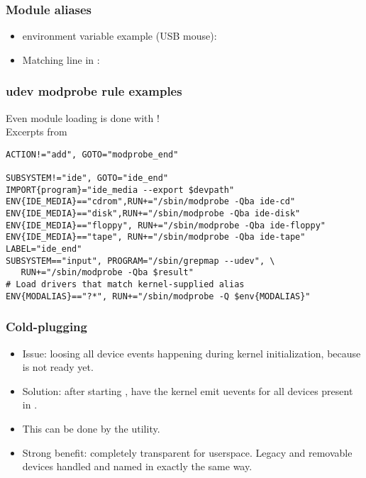 \begin{frame}
  \frametitle{Module aliases}
  \begin{itemize}
  \item {} environment variable example (USB mouse):\\
  \item Matching line in :\\
  \end{itemize}
\end{frame}

\begin{frame}[fragile]
  \frametitle{udev modprobe rule examples}
  Even module loading is done with !\\
  Excerpts from 
  \begin{block}{}
\footnotesize
\begin{verbatim}
ACTION!="add", GOTO="modprobe_end"

SUBSYSTEM!="ide", GOTO="ide_end"
IMPORT{program}="ide_media --export $devpath"
ENV{IDE_MEDIA}=="cdrom",RUN+="/sbin/modprobe -Qba ide-cd"
ENV{IDE_MEDIA}=="disk",RUN+="/sbin/modprobe -Qba ide-disk"
ENV{IDE_MEDIA}=="floppy", RUN+="/sbin/modprobe -Qba ide-floppy"
ENV{IDE_MEDIA}=="tape", RUN+="/sbin/modprobe -Qba ide-tape"
LABEL="ide_end"
SUBSYSTEM=="input", PROGRAM="/sbin/grepmap --udev", \
   RUN+="/sbin/modprobe -Qba $result"
# Load drivers that match kernel-supplied alias
ENV{MODALIAS}=="?*", RUN+="/sbin/modprobe -Q $env{MODALIAS}"
\end{verbatim}
  \end{block}
\end{frame}

\begin{frame}
  \frametitle{Cold-plugging}
  \begin{itemize}
  \item Issue: loosing all device events happening during kernel
    initialization, because \code{udev} is not ready yet.
  \item Solution: after starting , have the kernel emit
    uevents for all devices present in \code{/sys}.
  \item This can be done by the  utility.
  \item Strong benefit: completely transparent for userspace. Legacy
    and removable devices handled and named in exactly the same way.
  \end{itemize}
\end{frame}

